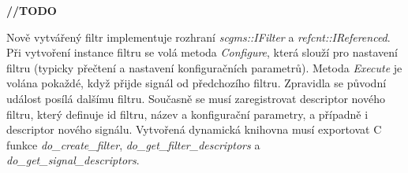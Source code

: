 \textbf{//TODO}

Nově vytvářený filtr implementuje rozhraní \textit{scgms::IFilter} a \textit{refcnt::IReferenced}. Při vytvoření instance filtru se volá metoda \textit{Configure}, která slouží pro nastavení filtru (typicky přečtení a nastavení konfiguračních parametrů). Metoda \textit{Execute} je volána pokaždé, když přijde signál od předchozího filtru. Zpravidla se původní událost posílá dalšímu filtru. Současně se musí zaregistrovat descriptor nového filtru, který definuje id filtru, název a konfigurační parametry, a případně i descriptor nového signálu. Vytvořená dynamická knihovna musí exportovat C funkce \textit{do\_create\_filter}, \textit{do\_get\_filter\_descriptors} a\\ \textit{do\_get\_signal\_descriptors}.
